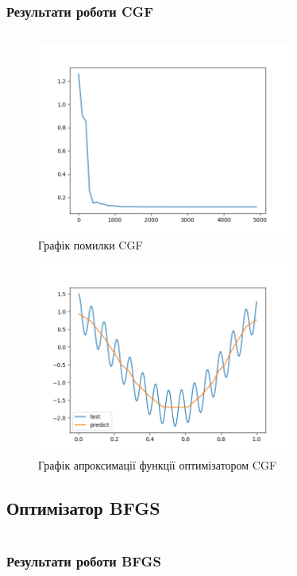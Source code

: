 \documentclass[a4paper,14pt]{extarticle}
\begin{document}
\subsubsection{Результати роботи CGF}
\inputminted[breaklines,linenos=true]{text}{output_cgf.txt}

\begin{figure}[H]
    \centering
    \includegraphics[width=0.75\textwidth]{cgf_loss.png}
    \caption{Графік помилки CGF}
\end{figure}
\begin{figure}[H]
    \centering
    \includegraphics[width=0.75\textwidth]{cgf_func.png}
    \caption{Графік апроксимації функції оптимізатором CGF}
\end{figure}

\subsection{Оптимізатор BFGS}
\inputminted[breaklines,linenos=true]{python}{bfgs.py}

\subsubsection{Результати роботи BFGS}
\inputminted[breaklines,linenos=true]{text}{output_bfgs.txt}
\end{document}
